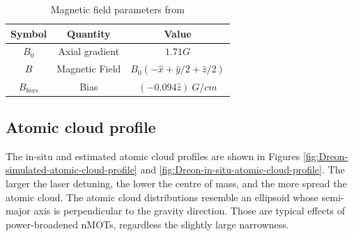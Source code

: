 \begin{table}[ht!]
    \centering
    \begin{tabular}{|c|c|c|}
        \hline
        \textbf{Symbol} & \textbf{Quantity} & \textbf{Value} \\ \hline
        $ B_0 $ & Axial gradient & $ 1.71 G $ \\
        $ B $ & Magnetic Field & $ B_0(-\hat{x} + \hat{y}/2 + \hat{z} / 2) $ \\
        $ B_{bias} $ & Bias & $ (-0.094 \hat{z})\ G / cm $ \\
        \hline
    \end{tabular}
    \caption{Magnetic field parameters from \cite{dreon2017optical}}
    \label{tab:Dreon-magnetic-field}
\end{table}

\subsection{Atomic cloud profile}
\label{sec:cloud-profile-dysprosium}

The in-situ and estimated atomic cloud profiles are shown in Figures \ref{fig:Dreon-simulated-atomic-cloud-profile} and \ref{fig:Dreon-in-situ-atomic-cloud-profile}. The larger the laser detuning, the lower the centre of mass, and the more spread the atomic cloud. The atomic cloud distributions resemble an ellipsoid whose semi-major axis is perpendicular to the gravity direction. Those are typical effects of power-broadened nMOTs, regardless the slightly large narrowness.

